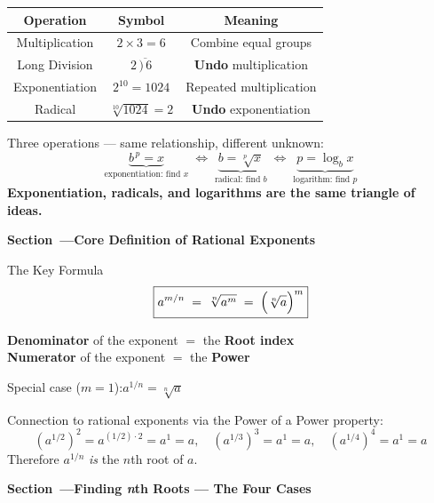 \documentclass[12pt]{article}
\newcounter{mysec}
\newcommand{\mysection}[1]{%
  \stepcounter{mysec}%
  \vspace{14pt}%
  \noindent
  \begin{tcolorbox}[enhanced,colback=navy,colframe=navy,
    boxrule=0pt,arc=3pt,left=8pt,right=8pt,top=5pt,bottom=5pt,
    before skip=0pt,after skip=10pt]
    \color{white}\bfseries\large Section~\themysec\enspace---\enspace #1
  \end{tcolorbox}}
\begin{document}
\begin{center}
\renewcommand{\arraystretch}{1.4}
\begin{tabular}{ccc}
\toprule
\textbf{Operation} & \textbf{Symbol} & \textbf{Meaning} \\
\midrule
Multiplication  & $2\times3=6$          & Combine equal groups \\
Long Division   & $2\,\overline{\big)\,6}$ & \textbf{Undo} multiplication \\
Exponentiation  & $2^{10}=1024$         & Repeated multiplication \\
Radical         & $\sqrt[10]{1024}=2$   & \textbf{Undo} exponentiation \\
\bottomrule
\end{tabular}
\end{center}

\begin{bigpicturebox}
Three operations --- same relationship, different unknown:
\[
  \underbrace{b^{\,p}=x}_{\text{exponentiation: find }x}
  \;\iff\;
  \underbrace{b=\sqrt[p]{x}}_{\text{radical: find }b}
  \;\iff\;
  \underbrace{p=\log_b x}_{\text{logarithm: find }p}
\]
\textbf{Exponentiation, radicals, and logarithms are the same triangle of ideas.}
\end{bigpicturebox}

\mysection{Core Definition of Rational Exponents}

\begin{conceptbox}{The Key Formula}
\[
  \boxed{a^{m/n} \;=\; \sqrt[n]{a^m} \;=\; \Bigl(\sqrt[n]{a}\Bigr)^m}
\]
\begin{center}
\large\textbf{Denominator} of the exponent $=$ the \textbf{Root index}\\[4pt]
\textbf{Numerator} of the exponent $=$ the \textbf{Power}
\end{center}

\medskip
Special case ($m=1$):\quad $a^{1/n}=\sqrt[n]{a}$
\end{conceptbox}

\noindent Connection to rational exponents via the Power of a Power property:
\[
  (a^{1/2})^2 = a^{(1/2)\cdot2}=a^1=a, \quad
  (a^{1/3})^3 = a^1=a, \quad
  (a^{1/4})^4 = a^1=a
\]
Therefore $a^{1/n}$ \emph{is} the $n$th root of $a$.

\mysection{Finding \textit{n}th Roots --- The Four Cases}
\end{document}
